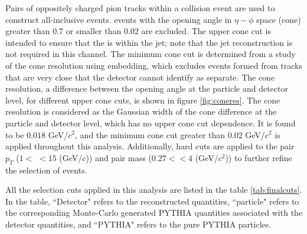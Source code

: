 Pairs of oppositely charged pion tracks within a collision event are used to construct all-inclusive \dipion events. \dipion events with the opening angle in $\eta - \phi$ space (cone) greater than 0.7 or smaller than 0.02 are excluded. The upper cone cut is intended to ensure that the \dipion is within the jet; note that the jet reconstruction is not required in this channel. The minimum cone cut is determined from a study of the cone resolution using embedding, which excludes \dipion events formed from tracks that are very close that the detector cannot identify as separate. The cone resolution, a difference between the \dipion opening angle at the particle and detector level, for different upper cone cuts, is shown in figure \ref{fig:coneres}. The cone resolution is considered as the Gaussian width of the cone difference at the particle and detector level, which has no upper cone cut dependence. It is found to be $0.018$ GeV/$c^2$, and the minimum cone cut greater than $0.02$ GeV/$c^2$ is applied throughout this analysis. Additionally, hard cuts are applied to the pair $p_T$ ($1<$ \ptpair $<15$ (GeV/$c$)) and pair mass ($0.27 <$\mpair$ <4$ (GeV/$c^2$)) to further refine the selection of \dipion events.

All the selection cuts applied in this analysis are listed in the table \ref{tab:finalcuts}. 
In the table, ``Detector" refers to the reconstructed quantities, ``particle" refers to the corresponding Monte-Carlo generated PYTHIA quantities associated with the detector quantities, and ``PYTHIA" refers to the pure PYTHIA particles.


